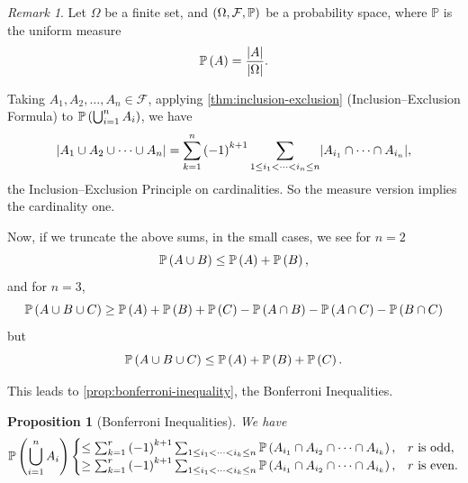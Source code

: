\documentclass{article}
\newtheorem{proposition}[theorem]{Proposition}
\theoremstyle{definition}
\theoremstyle{remark}
\newtheorem{remark}[theorem]{Remark}
\DeclarePairedDelimiter{\abs}{\lvert}{\rvert}
\newcommand{\Prob}{\mathbb{P}}
\newcommand{\eventSpace}{\mathcal{F}}
\begin{document}
\begin{remark}
    Let \(\Omega\) be a finite set, and \(\pqty{\Omega, \eventSpace, \Prob}\) be a probability space, where \(\Prob\) is the uniform measure
    \[
        \Prob\pqty{A} = \frac{\abs{A}}{\abs{\Omega}}.
    \]

    Taking \(A_1, A_2, \ldots, A_n \in \eventSpace\), applying \autoref{thm:inclusion-exclusion} (Inclusion--Exclusion Formula) to \(\Prob\pqty{\bigcup_{i = 1}^{n} A_i}\), we have
    \[
        \abs{A_1 \cup A_2 \cup \cdots \cup A_n} = \sum_{k = 1}^{n} \pqty{-1}^{k + 1} \sum_{1 \leq i_1 < \cdots < i_n \leq n} \abs{A_{i_1} \cap \cdots \cap A_{i_n}},
    \]
    the Inclusion--Exclusion Principle on cardinalities. So the measure version implies the cardinality one.
\end{remark}

Now, if we truncate the above sums, in the small cases, we see for \(n = 2\)
\[
    \Prob\pqty{A \cup B} \leq \Prob\pqty{A} + \Prob\pqty{B},
\]
and for \(n = 3\),
\[
    \Prob\pqty{A \cup B \cup C} \geq \Prob\pqty{A} + \Prob\pqty{B} + \Prob\pqty{C} - \Prob\pqty{A \cap B} - \Prob\pqty{A \cap C} - \Prob\pqty{B \cap C}
\]
but
\[
    \Prob\pqty{A \cup B \cup C} \leq \Prob\pqty{A} + \Prob\pqty{B} + \Prob\pqty{C}.
\]

This leads to \autoref{prop:bonferroni-inequality}, the Bonferroni Inequalities.

\begin{proposition}[Bonferroni Inequalities]
    \label{prop:bonferroni-inequality}%
    We have
    \[
        \Prob\pqty{\bigcup_{i = 1}^{n} A_i} \begin{cases}
            \leq \sum_{k = 1}^{r} \pqty{-1}^{k + 1} \sum_{1 \leq i_1 < \cdots < i_k \leq n} \Prob\pqty{A_{i_1} \cap A_{i_2} \cap \cdots \cap A_{i_k}}, & r \text{ is odd}, \\
            \geq \sum_{k = 1}^{r} \pqty{-1}^{k + 1} \sum_{1 \leq i_1 < \cdots < i_k \leq n} \Prob\pqty{A_{i_1} \cap A_{i_2} \cap \cdots \cap A_{i_k}}, & r \text{ is even}.
        \end{cases}
    \]
\end{proposition}
\end{document}
